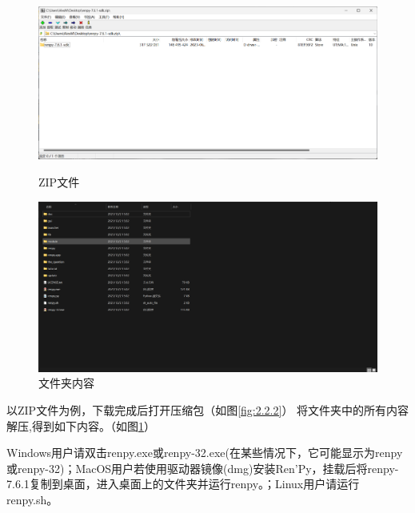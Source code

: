 \begin{figure}[htbp]
    \begin{minipage}{200pt}
        \centering
        \includegraphics[scale=.2]{Pictures/1/1.2/1.2.2.png}
        \caption{ZIP文件}
        \label{fig:2.2.2}
    \end{minipage}
    \begin{minipage}{180pt}
        \centering
        \includegraphics[scale=.15]{Pictures/1/1.2/1.2.3.png}
        \caption{文件夹内容}
        \label{fig:2.2.3}
    \end{minipage}
\end{figure}
以ZIP文件为例，下载完成后打开压缩包（如图\ref{fig:2.2.2}）
将文件夹中的所有内容解压,得到如下内容。（如图\ref{fig:2.2.3}）

Windows用户请双击renpy.exe或renpy-32.exe(在某些情况下，它可能显示为renpy或renpy-32)；MacOS用户若使用驱动器镜像(dmg)安装Ren'Py，挂载后将renpy-7.6.1复制到桌面，进入桌面上的文件夹并运行renpy。；Linux用户请运行renpy.sh。

